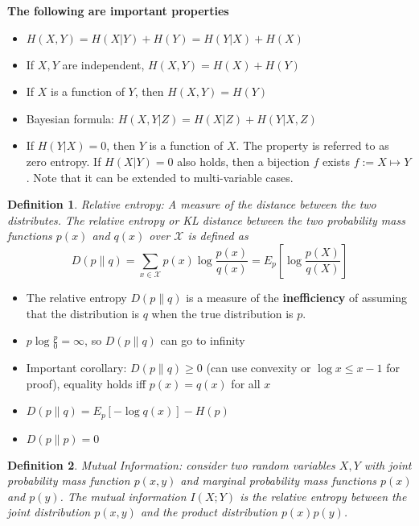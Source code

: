 \documentclass[10pt,landscape, a4paper]{article}
\newtheorem{definition}{Definition}
\begin{document}
\begin{multicols}{3}
\textbf{The following are important properties}
\begin{itemize}
    \item $H(X,Y)=H(X|Y)+H(Y)=H(Y|X)+H(X)$

    \item If $X,Y$ are independent, $H(X,Y)=H(X)+H(Y)$

    \item If $X$ is a function of $Y$, then $H(X,Y)=H(Y)$
    
    \item Bayesian formula: $ H(X,Y|Z)=H(X|Z)+H(Y|X,Z)$
    
    \item If $H(Y|X)=0$, then $Y$ is a function of $X$. The property is referred to as zero entropy. If $H(X|Y)=0$ also holds, then a bijection $f$ exists $f:=X\mapsto Y$. Note that it can be extended to multi-variable cases.
    
\end{itemize}

\begin{definition}
Relative entropy: A measure of the distance between the two distributes. The relative entropy or KL distance between the two probability mass functions $p(x)$ and $q(x)$ over $\mathcal{X}$ is defined as
$$
D(p\parallel q)=\sum_{x\in\mathcal{X}}p(x)\log\frac{p(x)}{q(x)}=E_p\left[\log\frac{p(X)}{q(X)}\right]
$$
\end{definition}

\begin{itemize}
    \item The relative entropy $D(p\parallel q)$ is a measure of the \textbf{inefficiency} of assuming that the distribution is $q$ when the true distribution is $p$.

    \item  $p\log \frac{p}{0}=\infty$, so $D(p\parallel q)$ can go to infinity
    
    \item  Important corollary: $D(p\parallel q)\ge 0$ (can use convexity or $\log x\le x-1$ for proof), equality holds iff $p(x)=q(x)$ for all $x$
    
    \item $D(p\parallel q)=E_p[-\log q(x)]-H(p)$
    
    \item $D(p\parallel p)=0$
\end{itemize}

\begin{definition}
    Mutual Information: consider two random variables $X,Y$ with joint probability mass function $p(x,y)$ and marginal probability mass functions $p(x)$ and $p(y)$. The mutual information $I(X;Y)$ is the relative entropy between the joint distribution $p(x,y)$ and the product distribution $p(x)p(y)$.


\end{definition}
\end{multicols}
\end{document}
